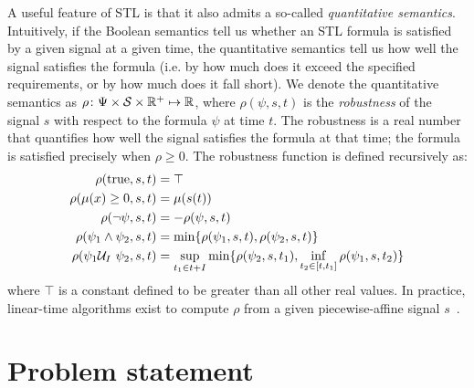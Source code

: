 A useful feature of STL is that it also admits a so-called \textit{quantitative semantics}. Intuitively, if the Boolean semantics tell us whether an STL formula is satisfied by a given signal at a given time, the quantitative semantics tell us how well the signal satisfies the formula (i.e. by how much does it exceed the specified requirements, or by how much does it fall short). We denote the quantitative semantics as $\rho \colon \Psi \times \mathcal{S} \times \mathbb{R}^+ \mapsto \mathbb{R}$, where $\rho(\psi, s, t)$ is the \textit{robustness} of the signal $s$ with respect to the formula $\psi$ at time $t$. The robustness is a real number that quantifies how well the signal satisfies the formula at that time; the formula is satisfied precisely when $\rho \geq 0$. The robustness function is defined recursively as:
\begin{align*}
    \rho(\text{true}, s, t)             & = \top                                                                                             \\
    \rho(\mu(x) \geq 0, s, t)           & = \mu(s(t))                                                                                        \\
    \rho(\neg\psi, s, t)                & = -\rho(\psi, s, t)                                                                                \\
    \rho(\psi_1 \wedge \psi_2, s, t)    & = \min\{\rho(\psi_1, s, t), \rho(\psi_2, s, t)\}                                                   \\
    \rho(\psi_1 \mathcal{U}_I\ \psi_2, s, t) & = \sup_{t_1 \in t + I} \min\{\rho(\psi_2, s, t_1),  \inf_{t_2 \in [t, t_1]} \rho(\psi_1, s, t_2)\}
\end{align*}
where $\top$ is a constant defined to be greater than all other real values. In practice, linear-time algorithms exist to compute $\rho$ from a given piecewise-affine signal $s$~\cite{donzeEfficientRobustMonitoring2013a}.

\section{Problem statement}

